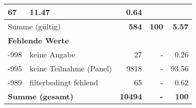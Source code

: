 \begin{longtable}{lXrrr}
       \num{67} &
       \num[round-mode=places,round-precision=2]{11,47} &
         \num[round-mode=places,round-precision=2]{0,64} \\
     \midrule
     \multicolumn{2}{l}{Summe (gültig)} &
       \textbf{\num{584}} &
     \textbf{100} &
       \textbf{\num[round-mode=places,round-precision=2]{5,57}} \\
     \multicolumn{5}{l}{\textbf{Fehlende Werte}}\\
       -998 &
       keine Angabe &
         \num{27} &
        - &
         \num[round-mode=places,round-precision=2]{0,26} \\
       -995 &
       keine Teilnahme (Panel) &
         \num{9818} &
        - &
         \num[round-mode=places,round-precision=2]{93,56} \\
       -989 &
       filterbedingt fehlend &
         \num{65} &
        - &
         \num[round-mode=places,round-precision=2]{0,62} \\
     \midrule
     \multicolumn{2}{l}{\textbf{Summe (gesamt)}} &
          \textbf{\num{10494}} &
        \textbf{-} &
        \textbf{100} \\
     \bottomrule
     \end{longtable}
     
